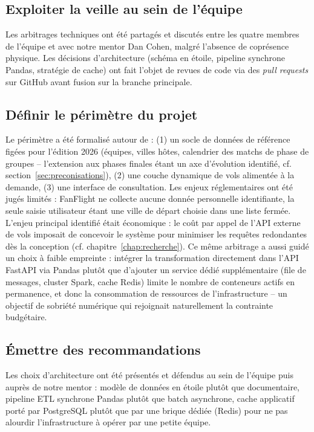 \documentclass[11pt,a4paper]{report}
\begin{document}
\subsection{Exploiter la veille au sein de l'équipe}

Les arbitrages techniques ont été partagés et discutés entre les quatre membres de l'équipe et avec notre mentor Dan Cohen, malgré l'absence de coprésence physique. Les décisions d'architecture (schéma en étoile, pipeline synchrone Pandas, stratégie de cache) ont fait l'objet de revues de code via des \emph{pull requests} sur GitHub avant fusion sur la branche principale.

\subsection{Définir le périmètre du projet}

Le périmètre a été formalisé autour de : (1) un socle de données de référence figées pour l'édition 2026 (équipes, villes hôtes, calendrier des matchs de phase de groupes -- l'extension aux phases finales étant un axe d'évolution identifié, cf. section~\ref{sec:preconisations}), (2) une couche dynamique de vols alimentée à la demande, (3) une interface de consultation. Les enjeux réglementaires ont été jugés limités : FanFlight ne collecte aucune donnée personnelle identifiante, la seule saisie utilisateur étant une ville de départ choisie dans une liste fermée. L'enjeu principal identifié était économique : le coût par appel de l'API externe de vols imposait de concevoir le système pour minimiser les requêtes redondantes dès la conception (cf. chapitre~\ref{chap:recherche}). Ce même arbitrage a aussi guidé un choix à faible empreinte : intégrer la transformation directement dans l'API FastAPI via Pandas plutôt que d'ajouter un service dédié supplémentaire (file de messages, cluster Spark, cache Redis) limite le nombre de conteneurs actifs en permanence, et donc la consommation de ressources de l'infrastructure -- un objectif de sobriété numérique qui rejoignait naturellement la contrainte budgétaire.

\subsection{Émettre des recommandations}

Les choix d'architecture ont été présentés et défendus au sein de l'équipe puis auprès de notre mentor : modèle de données en étoile plutôt que documentaire, pipeline ETL synchrone Pandas plutôt que batch asynchrone, cache applicatif porté par PostgreSQL plutôt que par une brique dédiée (Redis) pour ne pas alourdir l'infrastructure à opérer par une petite équipe.
\end{document}
